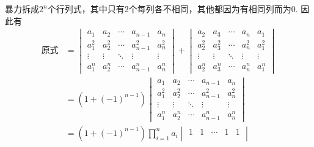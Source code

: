 \documentclass[UTF8,12pt,a4paper,fontset=fandol]{ctexart}
\begin{document}
\begin{solve}
暴力拆成$2^n$个行列式，其中只有2个每列各不相同，其他都因为有相同列而为0. 因此有
            \begin{align*}
                \text{原式} & =\begin{vmatrix}
                                    a_{1}     & a_{2}     & \cdots & a_{n-1}     & a_{n}     \\
                                    a_{1}^{2} & a_{2}^{2} & \cdots & a_{n-1}^{2} & a_{n}^{2} \\
                                    \vdots    & \vdots    & \ddots & \vdots      & \vdots    \\
                                    a_{1}^{n} & a_{2}^{n} & \cdots & a_{n-1}^{n} & a_{n}^{n}
                                \end{vmatrix}+
                \begin{vmatrix}
                    a_{2}     & a_{3}     & \cdots & a_{n}     & a_{1}     \\
                    a_{2}^{2} & a_{3}^{2} & \cdots & a_{n}^{2} & a_{1}^{2} \\
                    \vdots    & \vdots    & \ddots & \vdots    & \vdots    \\
                    a_{2}^{n} & a_{3}^{n} & \cdots & a_{n}^{n} & a_{1}^{n}
                \end{vmatrix}                                               \\
                            & =(1+(-1)^{n-1})\begin{vmatrix}
                                                a_{1}     & a_{2}     & \cdots & a_{n-1}     & a_{n}     \\
                                                a_{1}^{2} & a_{2}^{2} & \cdots & a_{n-1}^{2} & a_{n}^{2} \\
                                                \vdots    & \vdots    & \ddots & \vdots      & \vdots    \\
                                                a_{1}^{n} & a_{2}^{n} & \cdots & a_{n-1}^{n} & a_{n}^{n}
                                            \end{vmatrix}                \\
                            & =(1+(-1)^{n-1})\prod_{i=1}^na_i
                \begin{vmatrix}
                    1           & 1           & \cdots & 1             & 1           \\

\end{vmatrix}
\end{align*}
\end{solve}
\end{document}
